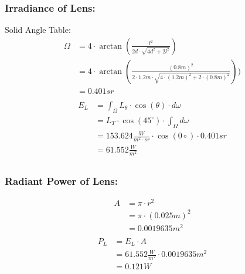 \documentclass{article}
\begin{document}
    \subsubsection*{Irradiance of Lens:}
    Solid Angle Table:
    \begin{align*}
        \Omega &= 4 \cdot \arctan \left( \frac{l^2}{2d \cdot \sqrt{4d^2 + 2l^2}} \right) \\
        &= 4 \cdot \arctan \left( \frac{(0.8 m)^2}{2 \cdot 1.2 m \cdot \sqrt{4 \cdot (1.2 m)^2 + 2 \cdot (0.8 m)^2}} \right)) \\
        &= 0.401 sr \\
    \end{align*}
    \begin{align*}
        E_L &= \int_{\Omega} L_{\theta} \cdot \cos(\theta) \cdot d\omega \\
        &= L_T \cdot \cos(45^{\circ}) \cdot \int_{\Omega} d\omega \\
        &= 153.624 \frac{W}{m^2 \cdot sr} \cdot \cos(0 \circ) \cdot 0.401 sr \\
        &= 61.552 \frac{W}{m^2} \\
    \end{align*}
    \subsubsection*{Radiant Power of Lens:}
    \begin{align*}
        A &= \pi \cdot r^2 \\
        &= \pi \cdot (0.025 m)^2 \\
        &= 0.0019635 m^2 \\
    \end{align*}
    \begin{align*}
        P_L &= E_L \cdot A \\
        &= 61.552 \frac{W}{m^2} \cdot 0.0019635 m^2 \\
        &= 0.121 W \\
    \end{align*}
\end{document}
